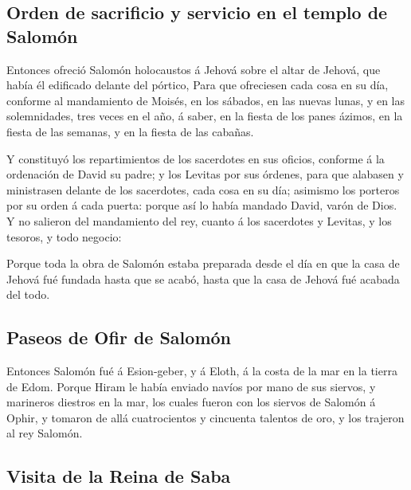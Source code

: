 \hypertarget{orden-de-sacrificio-y-servicio-en-el-templo-de-salomuxf3n}{%
\subsection{Orden de sacrificio y servicio en el templo de
Salomón}\label{orden-de-sacrificio-y-servicio-en-el-templo-de-salomuxf3n}}

 Entonces ofreció Salomón holocaustos á Jehová sobre el
altar de Jehová, que había él edificado delante del pórtico,
 Para que ofreciesen cada cosa en su día, conforme al
mandamiento de Moisés, en los sábados, en las nuevas lunas, y en las
solemnidades, tres veces en el año, á saber, en la fiesta de los panes
ázimos, en la fiesta de las semanas, y en la fiesta de las cabañas.

 Y constituyó los repartimientos de los sacerdotes en sus
oficios, conforme á la ordenación de David su padre; y los Levitas por
sus órdenes, para que alabasen y ministrasen delante de los sacerdotes,
cada cosa en su día; asimismo los porteros por su orden á cada puerta:
porque así lo había mandado David, varón de Dios.  Y no
salieron del mandamiento del rey, cuanto á los sacerdotes y Levitas, y
los tesoros, y todo negocio:

 Porque toda la obra de Salomón estaba preparada desde el
día en que la casa de Jehová fué fundada hasta que se acabó, hasta que
la casa de Jehová fué acabada del todo.

\hypertarget{paseos-de-ofir-de-salomuxf3n}{%
\subsection{Paseos de Ofir de
Salomón}\label{paseos-de-ofir-de-salomuxf3n}}

 Entonces Salomón fué á Esion-geber, y á Eloth, á la
costa de la mar en la tierra de Edom.  Porque Hiram le
había enviado navíos por mano de sus siervos, y marineros diestros en la
mar, los cuales fueron con los siervos de Salomón á Ophir, y tomaron de
allá cuatrocientos y cincuenta talentos de oro, y los trajeron al rey
Salomón.

\hypertarget{visita-de-la-reina-de-saba}{%
\subsection{Visita de la Reina de
Saba}\label{visita-de-la-reina-de-saba}}

